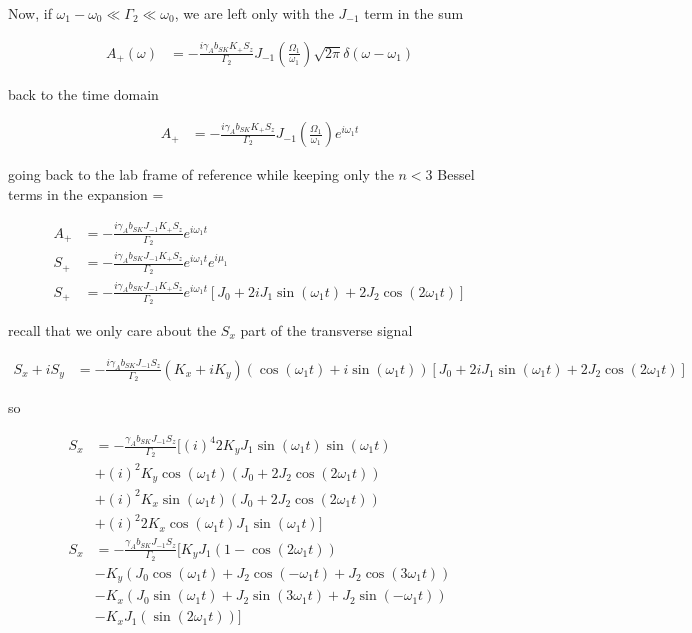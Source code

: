 \documentclass{article}
\begin{document}
Now, if $\omega_1-\omega_0\ll\Gamma_2\ll\omega_0$, we are left only with the $J_{-1}$ term in the sum

\begin{align}
      A_+\left(\omega\right)&= -\frac{i \gamma_{A}b_{SK}K_+ S_z}{\Gamma_2} J_{-1}\left(\frac{\Omega_1}{\omega_1}\right)\sqrt{2\pi} \delta\left(\omega - \omega_1\right)
\end{align}

back to the time domain

\begin{align}
      A_+ &= -\frac{i \gamma_{A}b_{SK}K_+ S_z}{\Gamma_2} J_{-1}\left(\frac{\Omega_1}{\omega_1}\right)e^{i\omega_1 t}
\end{align}

going back to the lab frame of reference while keeping only the $n<3$ Bessel terms in the expansion =

\begin{align}
      A_+ &= -\frac{i \gamma_{A}b_{SK}J_{-1}K_+ S_z}{\Gamma_2} e^{i\omega_1 t}\\
      S_+ &= -\frac{i \gamma_{A}b_{SK}J_{-1}K_+ S_z}{\Gamma_2}e^{i\omega_1 t}e^{i\mu_1}\\
      S_+ &= -\frac{i \gamma_{A}b_{SK}J_{-1}K_+ S_z}{\Gamma_2}e^{i\omega_1 t}\left[J_0+ 2i J_{1}\sin{\left(\omega_1 t\right)}+2 J_{2}\cos{\left(2\omega_1 t\right)}\right]
\end{align}

recall that we only care about the $S_x$ part of the transverse signal 

\begin{align}
      S_x  +i S_y &= -\frac{i \gamma_{A}b_{SK}J_{-1} S_z}{\Gamma_2}\left(K_x+iK_y\right)\left(\cos{(\omega_1 t)}+i\sin{(\omega_1 t)}\right)\left[J_0+ 2i J_{1}\sin{\left(\omega_1 t\right)}+2 J_{2}\cos{\left(2\omega_1 t\right)}\right]
\end{align}

so 

\begin{align}
      S_x &= -\frac{\gamma_{A}b_{SK}J_{-1} S_z}{\Gamma_2} \Bigg[(i)^4 2K_y J_{1}\sin{(\omega_1 t)}\sin{\left(\omega_1 t\right)}\\
      &+ (i)^2 K_y\cos{(\omega_1 t)}\left(J_0+ 2 J_{2}\cos{\left(2\omega_1 t\right)}\right)\\
      &+ (i)^2 K_x \sin{(\omega_1 t)}\left(J_0+ 2 J_{2}\cos{\left(2\omega_1 t\right)}\right)\\
      &+ (i)^2 2K_x\cos{(\omega_1 t)}J_{1}\sin{\left(\omega_1 t\right)}\Bigg]\\
      S_x &= -\frac{\gamma_{A}b_{SK}J_{-1} S_z}{\Gamma_2} \Bigg[ K_y J_{1}\left(1 - \cos{\left(2\omega_1 t\right)}\right)\\
      &-  K_y\left(J_0\cos{(\omega_1 t)}+  J_{2}\cos{(-\omega_1 t)}+J_{2}\cos{(3\omega_1 t)}\right)\\
      &-  K_x\left(J_0 \sin{(\omega_1 t)}+ J_{2} \sin{(3\omega_1 t)}+ J_{2} \sin{(-\omega_1 t)}\right)\\
      &- K_x J_{1}\left(\sin{\left(2\omega_1 t\right)}\right)\Bigg]
\end{align}
\end{document}
